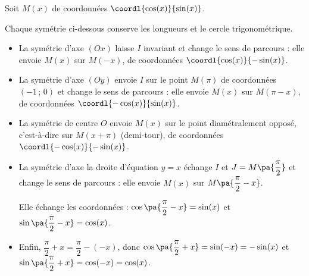 \begin{demonstration}
	Soit $M(x)$ de coordonnées $\coordl{\cos(x)}{\sin(x)}$.

	Chaque symétrie ci-dessous conserve les longueurs et le cercle trigonométrique.
	\begin{itemize}
		\item La symétrie d'axe $(Ox)$ laisse $I$ invariant et change le sens de parcours : elle envoie $M(x)$ sur $M(-x)$, de coordonnées $\coordl{\cos(x)}{-\sin(x)}$.
		\item La symétrie d'axe $(Oy)$ envoie $I$ sur le point $M(\pi)$ de coordonnées $(-1\,;\,0)$ et change le sens de parcours : elle envoie $M(x)$ sur $M(\pi - x)$, de coordonnées $\coordl{-\cos(x)}{\sin(x)}$.
		\item La symétrie de centre $O$ envoie $M(x)$ sur le point diamétralement opposé, c'est-à-dire sur $M(x + \pi)$ (demi-tour), de coordonnées $\coordl{-\cos(x)}{-\sin(x)}$.
		\item La symétrie d'axe la droite d'équation $y = x$ échange $I$ et $J = M\pa{\dfrac{\pi}{2}}$ et change le sens de parcours : elle envoie $M(x)$ sur $M\pa{\dfrac{\pi}{2} - x}$.

		      Elle échange les coordonnées : $\cos\pa{\dfrac{\pi}{2} - x} = \sin(x)$ et $\sin\pa{\dfrac{\pi}{2} - x} = \cos(x)$.
		\item Enfin, $\dfrac{\pi}{2} + x = \dfrac{\pi}{2} - (-x)$, donc $\cos\pa{\dfrac{\pi}{2} + x} = \sin(-x) = -\sin(x)$ et $\sin\pa{\dfrac{\pi}{2} + x} = \cos(-x) = \cos(x)$.
	\end{itemize}
\end{demonstration}

\newpage

